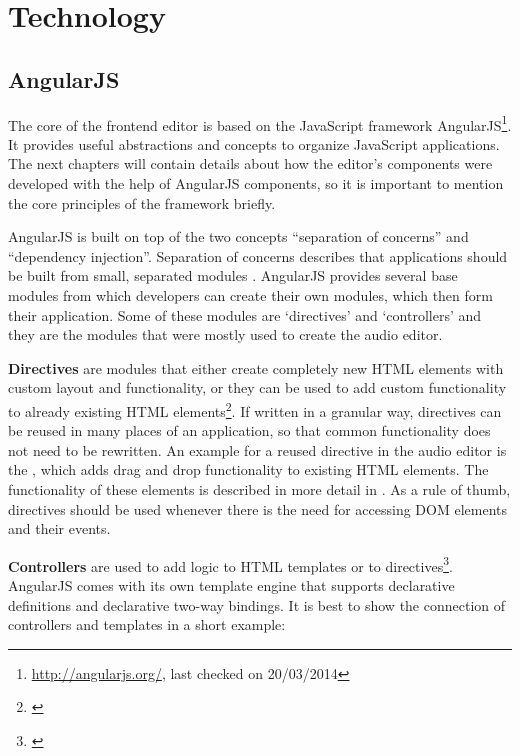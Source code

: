 \section{Technology}

\subsection{AngularJS}
\label{subsec:technology-angular}

The core of the frontend editor is based on the JavaScript framework AngularJS\footnote{\url{http://angularjs.org/}, last checked on 20/03/2014}. It provides useful abstractions and concepts to organize JavaScript applications. The next chapters will contain details about how the editor's components were developed with the help of AngularJS components, so it is important to mention the core principles of the framework briefly.

AngularJS is built on top of the two concepts ``separation of concerns'' and ``dependency injection''. Separation of concerns describes that applications should be built from small, separated modules \cite[p. 8]{lerner2013ngbook}. AngularJS provides several base modules from which developers can create their own modules, which then form their application. Some of these modules are `directives' and `controllers' and they are the modules that were mostly used to create the audio editor.

\textbf{Directives} are modules that either create completely new HTML elements with custom layout and functionality, or they can be used to add custom functionality to already existing HTML elements\footnote{\cite[p. 61ff]{lerner2013ngbook}}. If written in a granular way, directives can be reused in many places of an application, so that common functionality does not need to be rewritten. An example for a reused directive in the audio editor is the , which adds drag and drop functionality to existing HTML elements. The functionality of these elements is described in more detail in . As a rule of thumb, directives should be used whenever there is the need for accessing DOM elements and their events.

\textbf{Controllers} are used to add logic to HTML templates or to directives\footnote{\cite[p. 25ff]{lerner2013ngbook}}. AngularJS comes with its own template engine that supports declarative definitions and declarative two-way bindings. It is best to show the connection of controllers and templates in a short example:

